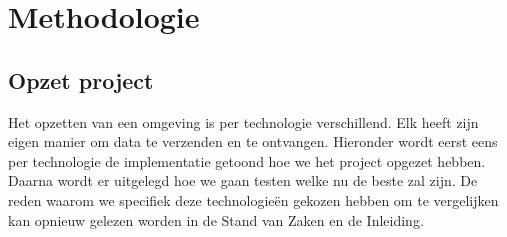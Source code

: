 
\chapter{Methodologie}
\label{ch:methodologie}



\section{Opzet project}
Het opzetten van een omgeving is per technologie verschillend. Elk heeft zijn eigen manier om data te verzenden en te ontvangen. Hieronder wordt eerst eens per technologie de implementatie getoond hoe we het project opgezet hebben. Daarna wordt er uitgelegd hoe we gaan testen welke nu de beste zal zijn. De reden waarom we specifiek deze technologieën gekozen hebben om te vergelijken kan opnieuw gelezen worden in de Stand van Zaken en de Inleiding.  

